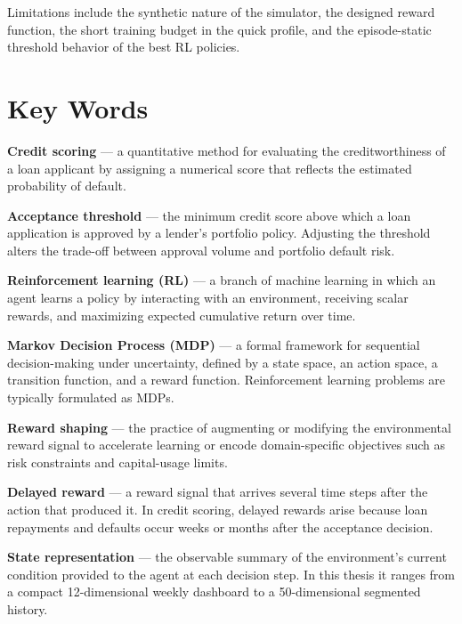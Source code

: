 \documentclass[12pt,a4paper]{article}
\begin{document}
Limitations include the synthetic nature of the simulator, the designed reward function, the short training budget in the quick profile, and the episode-static threshold behavior of the best RL policies.

\bigskip

\section*{Key Words}

\noindent\textbf{Credit scoring} --- a quantitative method for evaluating the creditworthiness of a loan applicant by assigning a numerical score that reflects the estimated probability of default.

\medskip\noindent\textbf{Acceptance threshold} --- the minimum credit score above which a loan application is approved by a lender's portfolio policy. Adjusting the threshold alters the trade-off between approval volume and portfolio default risk.

\medskip\noindent\textbf{Reinforcement learning (RL)} --- a branch of machine learning in which an agent learns a policy by interacting with an environment, receiving scalar rewards, and maximizing expected cumulative return over time.

\medskip\noindent\textbf{Markov Decision Process (MDP)} --- a formal framework for sequential decision-making under uncertainty, defined by a state space, an action space, a transition function, and a reward function. Reinforcement learning problems are typically formulated as MDPs.

\medskip\noindent\textbf{Reward shaping} --- the practice of augmenting or modifying the environmental reward signal to accelerate learning or encode domain-specific objectives such as risk constraints and capital-usage limits.

\medskip\noindent\textbf{Delayed reward} --- a reward signal that arrives several time steps after the action that produced it. In credit scoring, delayed rewards arise because loan repayments and defaults occur weeks or months after the acceptance decision.

\medskip\noindent\textbf{State representation} --- the observable summary of the environment's current condition provided to the agent at each decision step. In this thesis it ranges from a compact 12-dimensional weekly dashboard to a 50-dimensional segmented history.
\end{document}
